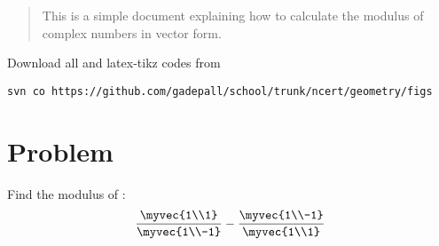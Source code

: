 \documentclass[journal,12pt,twocolumn]{IEEEtran}
\begin{document}
%

\begin{abstract}
This is a simple document explaining how to calculate the modulus of complex numbers in vector form.
\end{abstract}

%

Download all and latex-tikz codes from 
%
\begin{lstlisting}
svn co https://github.com/gadepall/school/trunk/ncert/geometry/figs
\end{lstlisting}
%


\section{Problem}
%
Find the modulus of :
\begin{align}
\frac{\myvec{1\\1}}{\myvec{1\\-1}} - \frac{\myvec{1\\-1}}{\myvec{1\\1}}
\end{align}
\end{document}

